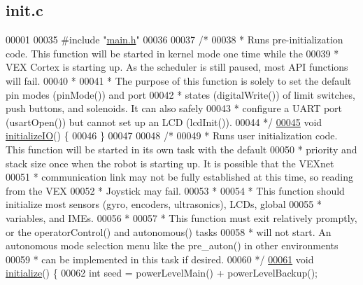 \hypertarget{init_8c_source}{}\subsection{init.\+c}
\label{init_8c_source}

\begin{DoxyCode}
00001 
00035 \textcolor{preprocessor}{#include "\hyperlink{main_8h}{main.h}"}
00036 
00037 \textcolor{comment}{/*}
00038 \textcolor{comment}{ * Runs pre-initialization code. This function will be started in kernel mode one time while the}
00039 \textcolor{comment}{ * VEX Cortex is starting up. As the scheduler is still paused, most API functions will fail.}
00040 \textcolor{comment}{ *}
00041 \textcolor{comment}{ * The purpose of this function is solely to set the default pin modes (pinMode()) and port}
00042 \textcolor{comment}{ * states (digitalWrite()) of limit switches, push buttons, and solenoids. It can also safely}
00043 \textcolor{comment}{ * configure a UART port (usartOpen()) but cannot set up an LCD (lcdInit()).}
00044 \textcolor{comment}{ */}
\hypertarget{init_8c_source.tex_l00045}{}\hyperlink{main_8h_ad9cda921edb01125bb13c2f86bcf624b}{00045} \textcolor{keywordtype}{void} \hyperlink{init_8c_ad9cda921edb01125bb13c2f86bcf624b}{initializeIO}() \{
00046 \}
00047 
00048 \textcolor{comment}{/*}
00049 \textcolor{comment}{ * Runs user initialization code. This function will be started in its own task with the default}
00050 \textcolor{comment}{ * priority and stack size once when the robot is starting up. It is possible that the VEXnet}
00051 \textcolor{comment}{ * communication link may not be fully established at this time, so reading from the VEX}
00052 \textcolor{comment}{ * Joystick may fail.}
00053 \textcolor{comment}{ *}
00054 \textcolor{comment}{ * This function should initialize most sensors (gyro, encoders, ultrasonics), LCDs, global}
00055 \textcolor{comment}{ * variables, and IMEs.}
00056 \textcolor{comment}{ *}
00057 \textcolor{comment}{ * This function must exit relatively promptly, or the operatorControl() and autonomous() tasks}
00058 \textcolor{comment}{ * will not start. An autonomous mode selection menu like the pre\_auton() in other environments}
00059 \textcolor{comment}{ * can be implemented in this task if desired.}
00060 \textcolor{comment}{ */}
\hypertarget{init_8c_source.tex_l00061}{}\hyperlink{main_8h_a25a40b6614565f755233080a384c35f1}{00061} \textcolor{keywordtype}{void} \hyperlink{init_8c_a25a40b6614565f755233080a384c35f1}{initialize}() \{
00062     \textcolor{keywordtype}{int} seed = powerLevelMain() + powerLevelBackup();

\end{DoxyCode}
